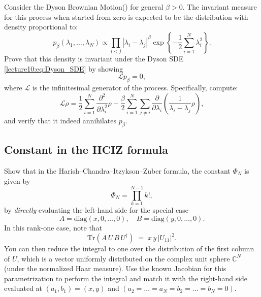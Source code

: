 \documentclass[letterpaper,11pt,oneside,reqno]{book}
\numberwithin{equation}{chapter}  %
\theoremstyle{definition}
\begin{document}
Consider the Dyson Brownian Motion() for general $\beta > 0$. The invariant measure for this process when started from zero is expected to be the distribution with density proportional to:
\begin{equation*}
p_{\beta}(\lambda_1,\ldots,\lambda_N) \propto \prod_{i<j}|\lambda_i-\lambda_j|^{\beta} \exp\left\{-\frac{1}{2}\sum_{i=1}^N \lambda_i^2\right\}.
\end{equation*}
Prove that this density is invariant under the Dyson SDE \eqref{lecture10:eq:Dyson_SDE} by showing
\begin{equation*}
\mathcal{L}p_{\beta} = 0,
\end{equation*}
where $\mathcal{L}$ is the infinitesimal generator of the process. Specifically, compute:
\begin{equation*}
\mathcal{L}\rho = \frac{1}{2}\sum_{i=1}^N
\frac{\partial^2}{\partial \lambda_i^2} \rho-
\frac{\beta}{2}\sum_{i=1}^N\sum_{j\neq
i}
\frac{\partial}{\partial\lambda_i}\left(
\frac{1}{\lambda_i-\lambda_j} \rho
\right),
\end{equation*}
and verify that it indeed annihilates $p_{\beta}$.

\subsection{Constant in the HCIZ formula}
\label{lecture10:prob:PhiN}

Show that in the Harish--Chandra--Itzykson--Zuber formula, the constant $\Phi_N$ is given by
\[
   \Phi_N = \prod_{k=1}^{N-1} k!,
\]
by \emph{directly} evaluating the left-hand side for the special case
\[
   A=\mathrm{diag}(x,0,\dots,0),
   \quad
   B=\mathrm{diag}(y,0,\dots,0).
\]
In this rank-one case, note that
\[
   \mathrm{Tr}(A\,U\,B\,U^\dagger)
   \;=\;
   x\,y \,\bigl|U_{11}\bigr|^2.
\]
You can then reduce the integral to one over the distribution of the first column of $U$,
which is a vector uniformly distributed on the complex unit sphere $\mathbb{C}^N$ (under the normalized Haar measure).
Use the known Jacobian for this parametrization to perform the integral and match it with
the right-hand side evaluated at $(a_1,b_1)=(x,y)$ and $(a_2=\dots=a_N=b_2=\dots=b_N=0)$.
\end{document}
